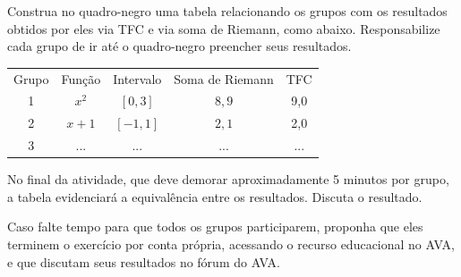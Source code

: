 \documentclass[a4paper,12pt]{scrartcl}
\begin{document}
\begin{list}{.}
	\item Construa no quadro-negro uma tabela relacionando os grupos com os resultados obtidos por eles via TFC e via soma de Riemann, como abaixo.
	Responsabilize cada grupo de ir até o quadro-negro preencher seus resultados.
	
	\medskip
	\hfill
	\begin{tabular}{ccccc}
	  Grupo & Função & Intervalo & Soma de Riemann & TFC \\
	  1     & $x^2$  & $[0,3]$   & $8,9$           & 9,0   \\
	  2     & $x+1$  & $[-1,1]$  & $2,1$           & 2,0   \\
	  3     & ...    & ...       & ...             & ...
	\end{tabular}
	\hfill{}
	\medskip
	
	\item No final da atividade, que deve demorar aproximadamente 5 minutos por grupo, a tabela evidenciará a equivalência entre os resultados.
	Discuta o resultado.
	
	Caso falte tempo para que todos os grupos participarem, proponha que eles terminem o exercício por conta própria, acessando o recurso educacional no AVA,
	e que discutam seus resultados no fórum do AVA.
      
      \end{list}
    
\end{document}
